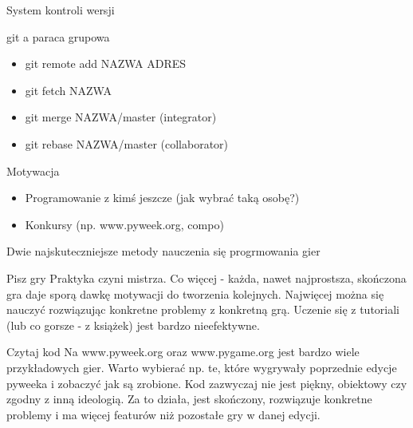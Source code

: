 \documentclass{beamer}
\begin{document}
\begin{frame}{System kontroli wersji}
  \begin{block}{git a paraca grupowa}
    \begin{itemize}
    \item git remote add NAZWA ADRES
    \item git fetch NAZWA
    \item git merge NAZWA/master  (integrator)
    \item git rebase NAZWA/master (collaborator)
    \end{itemize}
  \end{block}
\end{frame}

\begin{frame}{Motywacja}
  \begin{itemize}
  \item Programowanie z kimś jeszcze (jak wybrać taką osobę?)
  \item Konkursy (np. www.pyweek.org, compo)
  \end{itemize}
\end{frame}

\begin{frame}{Dwie najskuteczniejsze metody nauczenia się progrmowania gier}

  \begin{block}{Pisz gry}
    Praktyka czyni mistrza. Co więcej - każda, nawet najprostsza,
    skończona gra daje sporą dawkę motywacji do tworzenia
    kolejnych. Najwięcej można się nauczyć rozwiązując konkretne
    problemy z konkretną grą. Uczenie się z tutoriali (lub co gorsze -
    z książek) jest bardzo nieefektywne.
  \end{block}

  \begin{block}{Czytaj kod}
    Na www.pyweek.org oraz www.pygame.org jest bardzo wiele
    przykładowych gier. Warto wybierać np. te, które wygrywały
    poprzednie edycje pyweeka i zobaczyć jak są zrobione. Kod
    zazwyczaj nie jest piękny, obiektowy czy zgodny z inną
    ideologią. Za to działa, jest skończony, rozwiązuje konkretne
    problemy i ma więcej featurów niż pozostałe gry w danej edycji.
  \end{block}

\end{frame}
\end{document}

